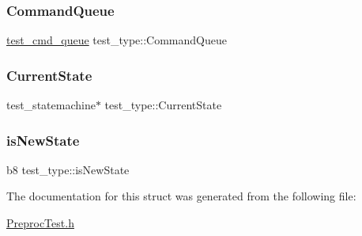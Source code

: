 \subsubsection{\texorpdfstring{Command\+Queue}{CommandQueue}}
{\footnotesize\ttfamily \hyperlink{structtest__cmd__queue}{test\+\_\+cmd\+\_\+queue} test\+\_\+type\+::\+Command\+Queue}

\mbox{\label{structtest__type_a48139457e16e23a57531e5af02be7f14}} 
\subsubsection{\texorpdfstring{Current\+State}{CurrentState}}
{\footnotesize\ttfamily test\+\_\+statemachine$\ast$ test\+\_\+type\+::\+Current\+State}

\mbox{\label{structtest__type_a36eb3041ef1341aec27a2a2d98500ce6}} 
\subsubsection{\texorpdfstring{is\+New\+State}{isNewState}}
{\footnotesize\ttfamily b8 test\+\_\+type\+::is\+New\+State}



The documentation for this struct was generated from the following file\+:\begin{DoxyCompactItemize}
\item 
\hyperlink{PreprocTest_8h}{Preproc\+Test.\+h}\end{DoxyCompactItemize}

